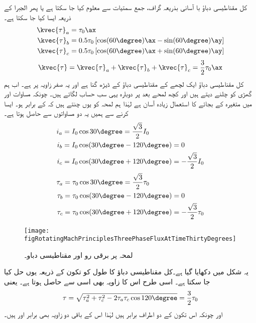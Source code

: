 کل مقناطیسی دباؤ با آسانی بذریعہ گراف، جمع سمتیات  سے معلوم کیا جا سکتا ہے یا پھر الجبرا کے ذریعہ ایسا کیا جا سکتا ہے۔
\begin{gather}
\begin{aligned}
\kvec{\tau}_a&=\tau_0 \ax\\
\kvec{\tau}_b&=0.5 \tau_0 \left[\cos (60\degree) \ax-\sin (60\degree)\ay \right]\\
\kvec{\tau}_c&=0.5 \tau_0 \left[\cos (60\degree) \ax+\sin (60\degree)\ay \right]
\end{aligned}
\end{gather}
%
\begin{align}
\kvec{\tau}=\kvec{\tau}_a+\kvec{\tau}_b+\kvec{\tau}_c=\frac{3}{2} \tau_0 \ax
\end{align}
کل مقناطیسی دباؤ ایک لچھے کے مقناطیسی دباؤ کے ڈیڑھ گنا ہے اور یہ صفر زاویہ پر ہے۔ اب ہم گھڑی کو چلنے دیتے ہیں اور کچھ لمحے بعد  پر دوبارہ یہی سب حساب لگاتے ہیں۔ چونکہ مساوات  اور  میں متغیرہ  کے بجائے  کا استعمال زیادہ آسان ہے لہٰذا ہم لمحہ  کو یوں چنتے ہیں کہ   کے برابر ہو۔ ایسا کرنے سے ہمیں یہ دو مساواتوں سے حاصل ہوتا ہے۔
\begin{gather}
\begin{aligned}
i_a&=I_0 \cos 30\degree=\frac{\sqrt{3}}{2} I_0\\
i_b&=I_0 \cos (30\degree-120\degree)=0\\
i_c&=I_0 \cos (30\degree+120\degree)=-\frac{\sqrt{3}}{2} I_0
\end{aligned}
\end{gather}
%
\begin{gather}
\begin{aligned}
\tau_a&=\tau_0 \cos 30\degree=\frac{\sqrt{3}}{2} \tau_0\\
\tau_b&=\tau_0 \cos (30\degree-120\degree)=0\\
\tau_c&=\tau_0 \cos (30\degree+120\degree)=-\frac{\sqrt{3}}{2} \tau_0
\end{aligned}
\end{gather}
%
\begin{figure}
\centering
\texttt{[image: figRotatingMachPrinciplesThreePhaseFluxAtTimeThirtyDegrees]}
\caption{ لمحہ  پر برقی رو اور مقناطیسی دباو۔}
\label{شکل_گھموتے_مشین_وقت_تیس_پر_دباو}
\end{figure}
یہ شکل   میں دکھایا گیا ہے۔کل مقناطیسی دباؤ کا طول  کو تکون کے ذریعہ یوں حل کیا جا سکتا ہے۔ اسی طرح اس کا زاویہ بھی اسی سے حاصل ہوتا ہے۔ یعنی
\begin{align}
\tau=\sqrt{\tau_a^2+\tau_c^2-2 \tau_a \tau_c \cos 120\degree}=\frac{3}{2}\tau_0
\end{align}
اور چونکہ اس تکون کے دو اطراف برابر ہیں لہٰذا اس کے باقی دو زاویہ بھی برابر اور  ہیں۔

